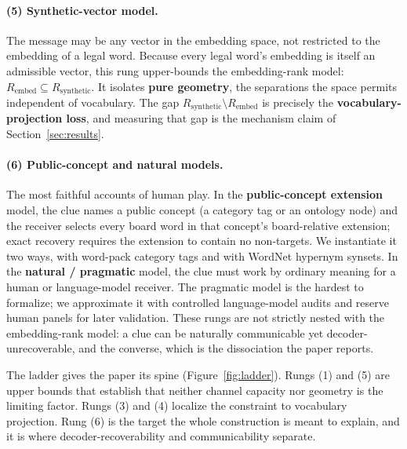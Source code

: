 \documentclass[11pt]{article}
\begin{document}
\paragraph{(5) Synthetic-vector model.}
The message may be any vector in the embedding space, not restricted to the
embedding of a legal word. Because every legal word's embedding is itself an
admissible vector, this rung upper-bounds the embedding-rank model:
$R_{\mathrm{embed}} \subseteq R_{\mathrm{synthetic}}$. It isolates \textbf{pure
geometry}, the separations the space permits independent of vocabulary. The gap
$R_{\mathrm{synthetic}} \setminus R_{\mathrm{embed}}$ is precisely the
\textbf{vocabulary-projection loss}, and measuring that gap is the mechanism
claim of Section~\ref{sec:results}.

\paragraph{(6) Public-concept and natural models.}
The most faithful accounts of human play. In the \textbf{public-concept
extension} model, the clue names a public concept (a category tag or an ontology
node) and the receiver selects every board word in that concept's board-relative
extension; exact recovery requires the extension to contain no non-targets. We
instantiate it two ways, with word-pack category tags and with WordNet hypernym
synsets. In the \textbf{natural / pragmatic} model, the clue must work by
ordinary meaning for a human or language-model receiver. The pragmatic model is
the hardest to formalize; we approximate it with controlled language-model audits
and reserve human panels for later validation. These rungs are not strictly
nested with the embedding-rank model: a clue can be naturally communicable yet
decoder-unrecoverable, and the converse, which is the dissociation the paper
reports.

The ladder gives the paper its spine (Figure~\ref{fig:ladder}). Rungs (1) and (5) are upper bounds that
establish that neither channel capacity nor geometry is the limiting factor.
Rungs (3) and (4) localize the constraint to vocabulary projection. Rung (6) is
the target the whole construction is meant to explain, and it is where
decoder-recoverability and communicability separate.
\end{document}
